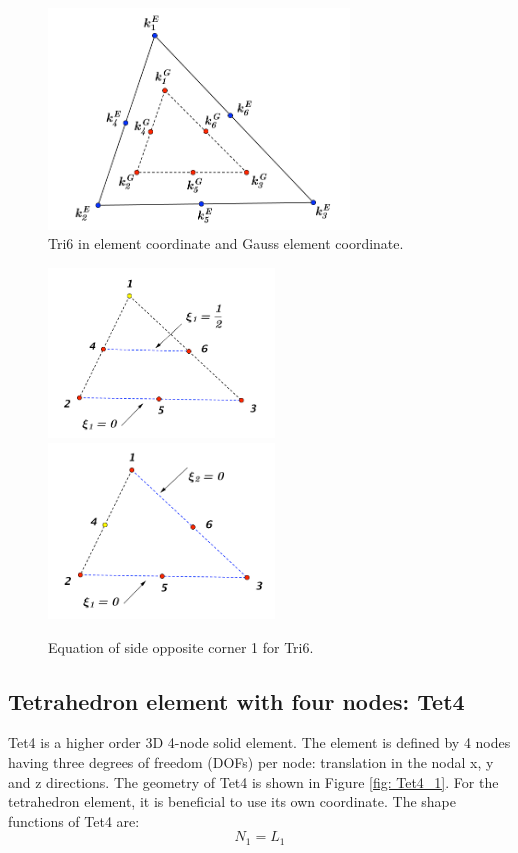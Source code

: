 \begin{figure}[h]
	\begin{center}
		\includegraphics[width=8cm,clip]{Tri6_1.pdf} 		
		\caption{Tri6 in element coordinate and Gauss element coordinate.} \label{fig: Tri6_1}	
	\end{center} 
\end{figure}

\begin{figure}[h]
	\begin{center}
		\includegraphics[width=6cm,clip]{Tri6_2.pdf}		
		\includegraphics[width=6cm,clip]{Tri6_3.pdf}		
		\caption{Equation of side opposite corner 1 for Tri6.} \label{fig: Tri6_2}
		
	\end{center} 
\end{figure}


\subsection{Tetrahedron element with four nodes: Tet4}
Tet4 is a higher order 3D 4-node solid element. The element is defined by 4 nodes having three degrees of freedom (DOFs) per node: translation in the nodal x, y and z directions. The geometry of Tet4 is shown in Figure \ref{fig: Tet4_1}. For the tetrahedron element, it is beneficial to use its own coordinate. The shape functions of Tet4 are:
\begin{equation}
N_1 = L_1
\end{equation}

